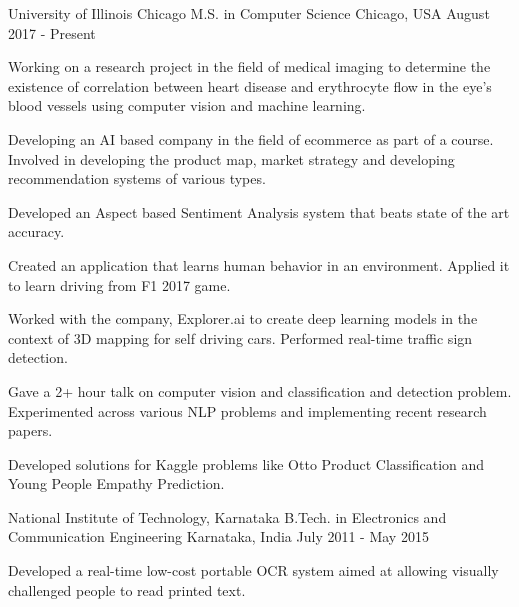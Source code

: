 

\begin{cventries}

  \cventry
    {University of Illinois Chicago} %
    {M.S. in Computer Science} %
    {Chicago, USA} %
    {August 2017 - Present} %
    {
      \begin{cvitems} %
        \item {Working on a research project in the field of medical imaging to determine the existence of correlation between heart disease and erythrocyte flow in the eye's blood vessels using computer vision and machine learning.}
        \item {Developing an AI based company in the field of ecommerce as part of a course. Involved in developing the product map, market strategy and developing recommendation systems of various types.}
        \item {Developed an Aspect based Sentiment Analysis system that beats state of the art accuracy.}
        \item {Created an application that learns human behavior in an environment. Applied it to learn driving from F1 2017 game.}
        \item {Worked with the company, Explorer.ai to create deep learning models in the context of 3D mapping for self driving cars. Performed real-time traffic sign detection.}
        \item {Gave a 2+ hour talk on computer vision and classification and detection problem. Experimented across various NLP problems and implementing recent research papers.}
        \item {Developed solutions for Kaggle problems like Otto Product Classification and Young People Empathy Prediction.}
      \end{cvitems}
    }

  \cventry
    {National Institute of Technology, Karnataka} %
    {B.Tech. in Electronics and Communication Engineering} %
    {Karnataka, India} %
    {July 2011 - May 2015} %
    {
      \begin{cvitems} %
        \item {Developed a real-time low-cost portable OCR system aimed at allowing visually challenged people to read printed text.}
      \end{cvitems}
    }

\end{cventries}
